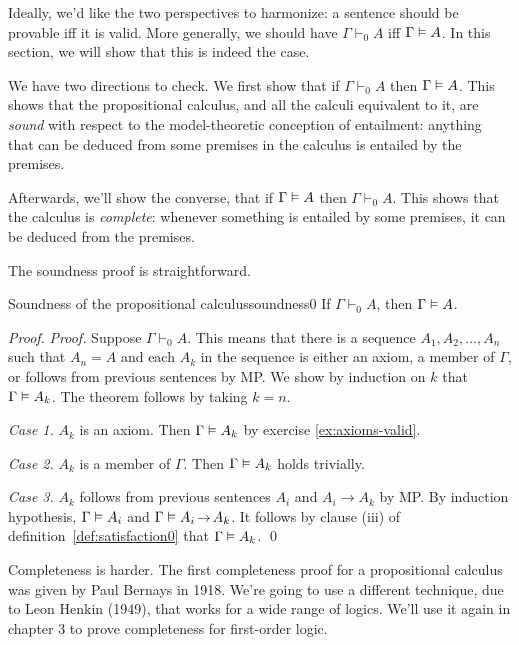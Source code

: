 
Ideally,
we'd like the two perspectives to harmonize:
a sentence should be provable
iff it is valid.
More generally,
we should have $\Gamma \vdash_{0} A$ iff $\Gamma \vDash A$.
In this section,
we will show that this is indeed the case.

We have two directions to check.
We first show that if $\Gamma \vdash_{0} A$ then $\Gamma \vDash A$.
This shows that
the propositional calculus, and all the calculi equivalent to it,
are \textit{sound} with respect to
the model-theoretic conception of entailment:
anything that can be deduced from some premises in the calculus is entailed by the premises.

Afterwards,
we'll show the converse,
that if $\Gamma \vDash A$ then $\Gamma \vdash_{0} A$.
This shows that the calculus is \textit{complete}:
whenever something is entailed by some premises, it can be deduced from the premises.

The soundness proof is straightforward.

\begin{theorem}{Soundness of the propositional calculus}{soundness0}
  If $\Gamma \vdash_{0} A$, then $\Gamma \vDash A$.
\end{theorem}
\begin{proof}
  \emph{Proof.}
  Suppose $\Gamma \vdash_{0} A$.
  This means that
  there is a sequence $A_1, A_2, \ldots, A_n$ such that $A_n = A$ and
  each $A_k$ in the sequence is
  either an axiom, a member of $\Gamma$, or follows from previous sentences by MP.
  We show by induction on $k$ that
  $\Gamma \vDash A_k$.
  The theorem follows by taking $k = n$.

  \textit{Case 1.} $A_{k}$ is an axiom.
  Then $\Gamma \vDash A_{k}$ by exercise \ref{ex:axioms-valid}.

  \textit{Case 2.} $A_{k}$ is a member of $\Gamma$.
  Then $\Gamma \vDash A_{k}$ holds trivially.

  \textit{Case 3.} $A_{k}$ follows from previous sentences $A_{i}$ and $A_{i} \to A_{k}$ by MP.
  By induction hypothesis, $\Gamma \vDash A_{i}$ and $\Gamma \entails A_{i} \to A_{k}$.
  It follows by clause (iii) of definition~\ref{def:satisfaction0} that
  $\Gamma \vDash A_{k}$. \qed
\end{proof}

Completeness is harder.
The first completeness proof for a propositional calculus was given by Paul Bernays in 1918.
We're going to use a different technique, due to Leon Henkin (1949),
that works for a wide range of logics.
We'll use it again in chapter 3 to prove completeness for first-order logic.

